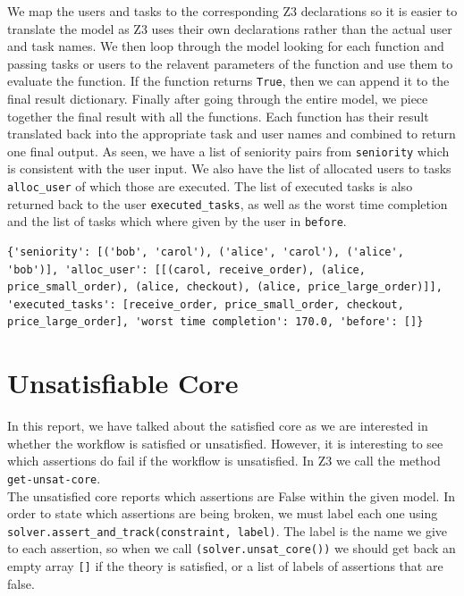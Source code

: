 \documentclass[a4paper]{report}
\begin{document}
We map the users and tasks to the corresponding Z3 declarations so it is easier to translate the model as Z3 uses their own declarations rather than the actual user and task names. We then loop through the model looking for each function and passing tasks or users to the relavent parameters of the function and use them to evaluate the function. If the function returns \texttt{True}, then we can append it to the final result dictionary. Finally after going through the entire model, we piece together the final result with all the functions. Each function has their result translated back into the appropriate task and user names and combined to return one final output. As seen, we have a list of seniority pairs from \texttt{seniority} which is consistent with the user input. We also have the list of allocated users to tasks \texttt{alloc\_user} of which those are executed. The list of executed tasks is also returned back to the user \texttt{executed\_tasks}, as well as the worst time completion and the list of tasks which where given by the user in \texttt{before}.

\begin{lstlisting}[frame=single]
{'seniority': [('bob', 'carol'), ('alice', 'carol'), ('alice', 'bob')], 'alloc_user': [[(carol, receive_order), (alice, price_small_order), (alice, checkout), (alice, price_large_order)]], 'executed_tasks': [receive_order, price_small_order, checkout, price_large_order], 'worst time completion': 170.0, 'before': []}
\end{lstlisting}

\section{Unsatisfiable Core}
In this report, we have talked about the satisfied core as we are interested in whether the workflow is satisfied or unsatisfied. However, it is interesting to see which assertions do fail if the workflow is unsatisfied. In Z3 we call the method \texttt{get-unsat-core}. \\

The unsatisfied core reports which assertions are False within the given model. In order to state which assertions are being broken, we must label each one using \texttt{solver.assert\_and\_track(constraint, label)}. The label is the name we give to each assertion, so when we call \texttt{(solver.unsat\_core())} we should get back an empty array \texttt{[]} if the theory is satisfied, or a list of labels of assertions that are false.
\end{document}
